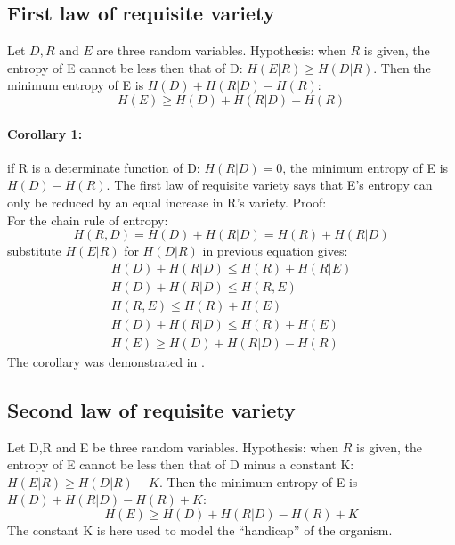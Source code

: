 \subsection{First law of requisite variety}
Let $D,R$ and $E$ are three random variables.
Hypothesis: when $R$ is given, the entropy of E cannot be less then that of D: $H(E|R)\geq H(D|R)$.
Then the minimum entropy of E is $H(D)+H(R|D)-H(R)$:
\begin{equation}
H(E)\geq H(D)+H(R|D)-H(R) \label{variety:eq:minh}
\end{equation}
\paragraph{Corollary 1:}
if R is a determinate function of D: $H(R|D)=0$, the minimum entropy of E is $H(D)-H(R)$.
The first law of requisite variety says that E's entropy can only be reduced by
 an equal increase in R's variety.
Proof:\\
For the chain rule of entropy:
\begin{equation}
H(R,D)=H(D)+H(R|D)=H(R)+H(R|D)
\end{equation}
substitute $H(E|R)$ for $H(D|R)$ in previous equation gives:
\begin{eqnarray}
H(D)+H(R|D) \leq H(R)+H(R|E)\\
H(D)+H(R|D) \leq H(R,E)\\
H(R,E) \leq H(R)+H(E)\\
H(D) +H(R|D)\leq H(R)+H(E)\\
H(E) \geq H(D) +H(R|D)-H(R)
\end{eqnarray}
The corollary was demonstrated in \citet{Ashby1956:IntroCybernetics}.

\subsection{Second law of requisite variety}
Let D,R and E be three random variables.
Hypothesis: when $R$ is given, the entropy of E cannot be less then that of
 D minus a constant K: $H(E|R)\geq H(D|R)-K$.
Then the minimum entropy of E is $H(D)+H(R|D)-H(R)+K$:
\begin{equation}
H(E)\geq H(D)+H(R|D)-H(R)+K
\end{equation}
The constant K is here used to model the ``handicap'' of the organism.


